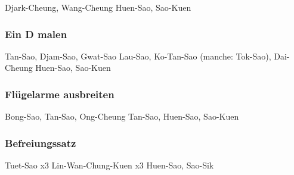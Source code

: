 Djark-Cheung, Wang-Cheung
Huen-Sao, Sao-Kuen

\subsubsection{Ein D malen} %

Tan-Sao, Djam-Sao, Gwat-Sao
Lau-Sao, Ko-Tan-Sao (manche: Tok-Sao), Dai-Cheung
Huen-Sao, Sao-Kuen

\subsubsection{Fl\"ugelarme ausbreiten} %

Bong-Sao, Tan-Sao, Ong-Cheung
Tan-Sao, Huen-Sao, Sao-Kuen

\subsubsection{Befreiungssatz} %

Tuet-Sao x3
Lin-Wan-Chung-Kuen x3
Huen-Sao, Sao-Sik




